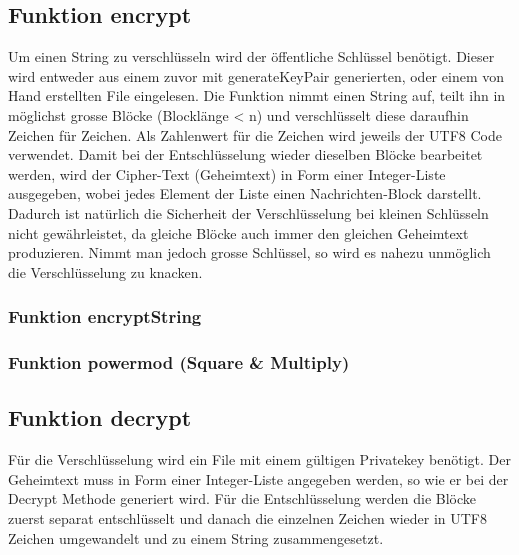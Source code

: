 \documentclass[a4paper, 11pt]{article} %
\begin{document}
\subsection{Funktion encrypt}
Um einen String zu verschlüsseln wird der öffentliche Schlüssel benötigt. Dieser wird entweder aus einem zuvor mit generateKeyPair generierten, oder einem von Hand erstellten File eingelesen.
Die Funktion nimmt einen String auf, teilt ihn in möglichst grosse Blöcke (Blocklänge < n) und verschlüsselt diese daraufhin Zeichen für Zeichen. Als Zahlenwert für die Zeichen wird jeweils der UTF8 Code verwendet.
Damit bei der Entschlüsselung wieder dieselben Blöcke bearbeitet werden, wird der Cipher-Text (Geheimtext) in Form einer Integer-Liste ausgegeben, wobei jedes Element der Liste einen Nachrichten-Block darstellt.
Dadurch ist natürlich die Sicherheit der Verschlüsselung bei kleinen Schlüsseln nicht gewährleistet, da gleiche Blöcke auch immer den gleichen Geheimtext produzieren. Nimmt man jedoch grosse Schlüssel, 
 so wird es nahezu unmöglich die Verschlüsselung zu knacken.




\subsubsection{Funktion encryptString}


\subsubsection{Funktion powermod (Square \& Multiply)}



\subsection{Funktion decrypt}
Für die Verschlüsselung wird ein File mit einem gültigen Privatekey benötigt. Der Geheimtext muss in Form einer Integer-Liste angegeben werden, so wie er bei der Decrypt Methode generiert wird.
Für die Entschlüsselung werden die Blöcke zuerst separat entschlüsselt und danach die einzelnen Zeichen wieder in UTF8 Zeichen umgewandelt und zu einem String zusammengesetzt.

\end{document}
